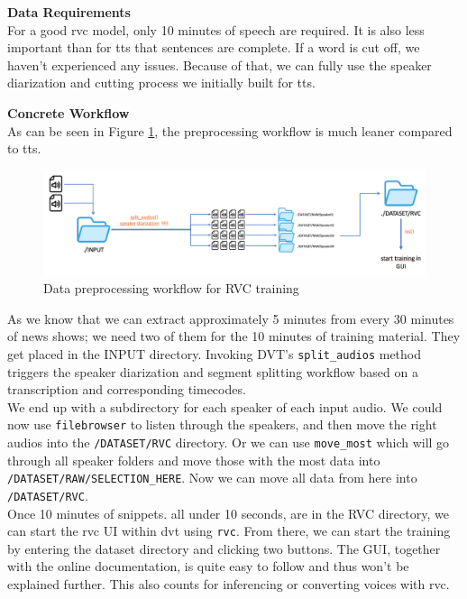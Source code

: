 \documentclass[
  a4paper,  %
  twoside,  %
  bibliography=totoc,
  headsepline,
  cleardoublepage=empty,
  parskip=half,
  draft=false
]{scrbook}
\begin{document}
\textbf{Data Requirements} \\
For a good \gls{rvc} model, only 10 minutes of speech are required. It is also less important than for \gls{tts} that sentences are complete. If a word is cut off, we haven't experienced any issues. Because of that, we can fully use the speaker diarization and cutting process we initially built for \gls{tts}. 

\textbf{Concrete Workflow} \\
As can be seen in Figure \ref{fig:rvc-wf}, the preprocessing workflow is much leaner compared to \gls{tts}.
\begin{figure}[h]
  \centering
  \includegraphics[width=1\textwidth]{./graphics/images/rvc/rvc-workflow.png}
  \caption{Data preprocessing workflow for RVC training}
  \label{fig:rvc-wf}
\end{figure}
As we know that we can extract approximately 5 minutes from every 30 minutes of news shows; we need two of them for the 10 minutes of training material. They get placed in the INPUT directory. Invoking DVT's \verb|split_audios| method triggers the speaker diarization and segment splitting workflow based on a transcription and corresponding timecodes. \\
We end up with a subdirectory for each speaker of each input audio. We could now use \verb|filebrowser| to listen through the speakers, and then move the right audios into the \verb|/DATASET/RVC| directory. Or we can use \verb|move_most| which will go through all speaker folders and move those with the most data into \verb|/DATASET/RAW/SELECTION_HERE|. Now we can move all data from here into \verb|/DATASET/RVC|. \\
Once 10 minutes of snippets. all under 10 seconds, are in the RVC directory, we can start the \gls{rvc} UI within \gls{dvt} using \verb|rvc|. From there, we can start the training by entering the dataset directory and clicking two buttons. The GUI, together with the online documentation, is quite easy to follow and thus won't be explained further. This also counts for inferencing or converting voices with \gls{rvc}.
\end{document}
